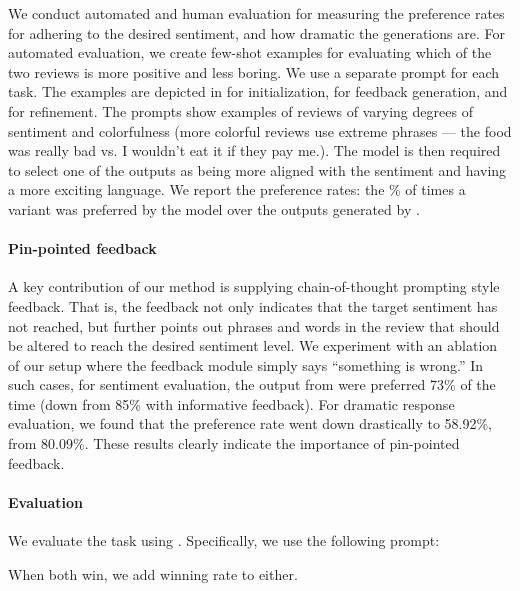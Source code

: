 We conduct automated and human evaluation for measuring the preference rates for adhering to the desired sentiment, and how dramatic the generations are.
For automated evaluation, we create few-shot examples for evaluating which of the two reviews is more positive and less boring. We use a separate prompt for each task.
The examples are depicted in  for initialization,  for feedback generation, and  for refinement.
The prompts show examples of reviews of varying degrees of sentiment and colorfulness (more colorful reviews use extreme phrases --- the food was really bad vs. I wouldn't eat it if they pay me.).
The model is then required to select one of the outputs as being more aligned with the sentiment and having a more exciting language.
We report the preference rates: the \% of times a variant was preferred by the model over the outputs generated by \ours.



\paragraph{Pin-pointed feedback}

A key contribution of our method is supplying chain-of-thought prompting style feedback.
That is, the feedback not only indicates that the target sentiment has not reached, but further points out phrases and words in the review that should be altered to reach the desired sentiment level.
We experiment with an ablation of our setup where the feedback module simply says ``something is wrong.''
In such cases, for sentiment evaluation, the output from \ours were preferred 73\% of the time (down from 85\% with informative feedback).
For dramatic response evaluation, we found that the preference rate went down drastically to 58.92\%, from 80.09\%.
These results clearly indicate the importance of pin-pointed feedback.







\paragraph{Evaluation}

We evaluate the task using \gptf. Specifically, we use the following prompt:





When both win, we add winning rate to either. 
